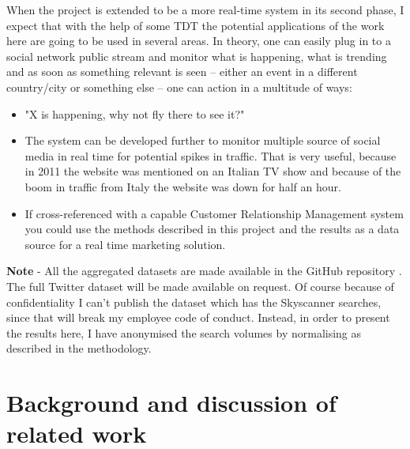 \documentclass[minf,twoside,singlespacing,parskip,frontabs,notimes,11pt]{infthesis}
\begin{document}
When the project is extended to be a more real-time system in its second phase, I expect that with the help of some TDT the potential applications of the work here are going to be used in several areas. In theory, one can easily plug in to a social network public stream and monitor what is happening, what is trending and as soon as something relevant is seen -- either an event in a different country/city or something else -- one can action in a multitude of ways:


\begin{itemize}
\item "X is happening, why not fly there to see it?"
\item The system can be developed further to monitor multiple source of social media in real time for potential spikes in traffic. That is very useful, because in 2011 the website was mentioned on an Italian TV show and because of the boom in traffic from Italy the website was down for half an hour. 
\item If cross-referenced with a capable Customer Relationship Management system you could use the methods described in this project and the results as a data source for a real time marketing solution.
\end{itemize}




\textbf{Note} - All the aggregated datasets are made available in the GitHub repository \cite{code}.  The full Twitter dataset will be made available on request. Of course because of confidentiality I can't publish the dataset which has the Skyscanner searches, since that will break my employee code of conduct. Instead, in order to present the results here, I have anonymised the search volumes by normalising as described in the methodology. 


\section{Background and discussion of related work}
\end{document}
